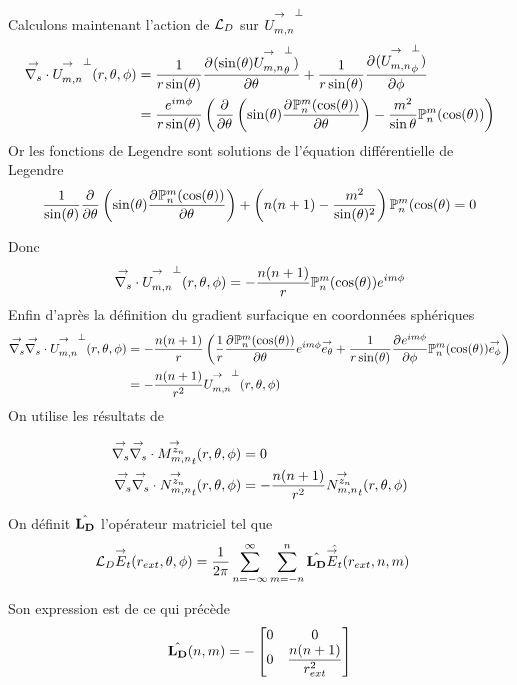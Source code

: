     Calculons maintenant l'action de \(\LD\) sur \(\Umn^\perp\)
    \begin{align*}
      \vdivs{}\Umn^\perp(\rtp) &= \frac{1}{r\sin(\theta)} \ddr{\theta}{(\sin(\theta)\Umn^\perp_\theta)} + \frac{1}{r\sin(\theta)}\ddr{\phi}{(\Umn^\perp_\phi)}
      \\
      &= \frac{e^{im\phi}}{r\sin(\theta)}
      \left(
        \ddr{\theta}{}\left(\sin(\theta)\ddr{\theta}{\Pmn(\cos(\theta))}\right) - \frac{m^2}{\sin\theta}\Pmn(\cos(\theta))
      \right)
    \end{align*}
    Or les fonctions de Legendre sont solutions de l'équation différentielle de Legendre
    \begin{align}
      \frac{1}{\sin(\theta)}\ddr{\theta}{}\left(\sin(\theta)\ddr{\theta}{\Pmn(\cos(\theta))}\right) + \left(n(n+1)-\frac{m^2}{\sin(\theta)^2}\right)\Pmn(\cos(\theta) = 0
    \end{align}

    Donc 
    \begin{align*}
       \vdivs{}\Umn^\perp(\rtp) = -\frac{n(n+1)}{r}\Pmn(\cos(\theta))e^{im\phi}
    \end{align*}
    Enfin d’après la définition du gradient surfacique en coordonnées sphériques
    \begin{align*}
       \vgrads{}\vdivs{}\Umn^\perp(\rtp) &= -\frac{n(n+1)}{r}\left(\frac{1}{r}\ddr{\theta}{\Pmn(\cos(\theta))}e^{im\phi}\vect{e_\theta}+\frac{1}{r\sin(\theta)}\ddr{\phi}{e^{im\phi}}\Pmn(\cos(\theta))\vect{e_\phi}\right)
       \\
       &=-\frac{n(n+1)}{r^2}\Umn^\perp(\rtp)
    \end{align*}
    On utilise les résultats de \cite{marceaux_high-order_2000}

    \begin{align*}
      \vgrads{}\vdivs{} \Mmn[z_n]_t(r,\theta,\phi) &= 0
      \\
      \vgrads{}\vdivs{} \Nmn[z_n]_t(r,\theta,\phi) &= -\frac{n(n+1)}{r^2}\Nmn[z_n]_t(r,\theta,\phi)
    \end{align*}

    On définit \(\hat{\mLD}\) l'opérateur matriciel tel que
    \begin{align}
      \LD \vE_t (r_{ext},\theta,\phi)
      &= \frac{1}{2\pi}\sum_{n=-\infty}^\infty\sum_{m=-n}^n \hat{\mLD} \hat{\vE_t}(r_{ext},n,m)
    \end{align}

    Son expression est de ce qui précède
    \begin{equation}
      \label{eq:sphere:fourier:LD}
      \hat{\mLD}(n,m) = -
      \begin{bmatrix}
        0 & 0
        \\
        0 & \frac{n(n+1)}{r_{ext}^2}
      \end{bmatrix}
    \end{equation}


